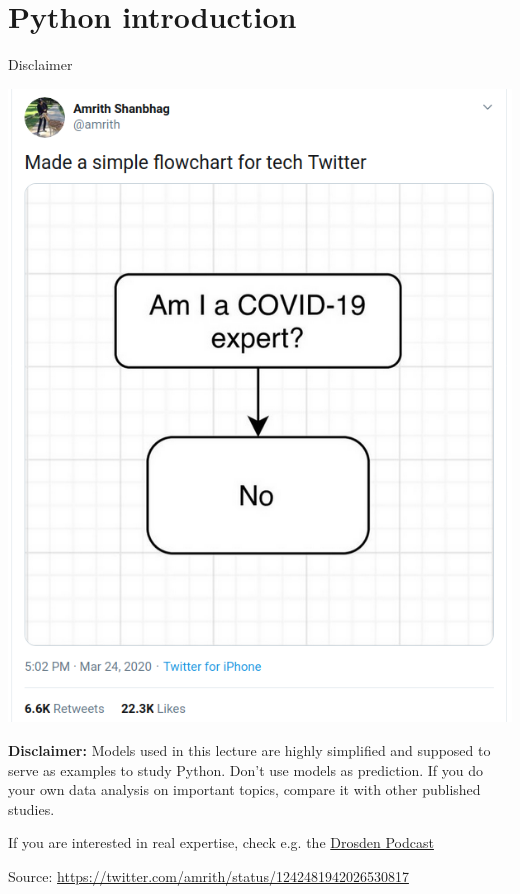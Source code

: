 \section{Python introduction}


\begin{frame}[fragile]{Disclaimer}
	\begin{center}
		\includegraphics[height=0.6\textheight]{covid-19-expert.png}
	\end{center}

	\pause
	\textbf{Disclaimer:} Models used in this lecture are highly simplified and supposed to serve as examples
	to study Python. Don't use models as prediction. If you do your own data analysis on important
	topics, compare it with other published studies.

	If you are interested in real expertise, check e.g. the \href{https://www.ndr.de/nachrichten/info/Corona-Podcast-Alle-Folgen-in-der-Uebersicht,podcastcoronavirus134.html}{Drosden Podcast}


	{\tiny Source: \href{https://twitter.com/amrith/status/1242481942026530817}{https://twitter.com/amrith/status/1242481942026530817}}
\end{frame}

